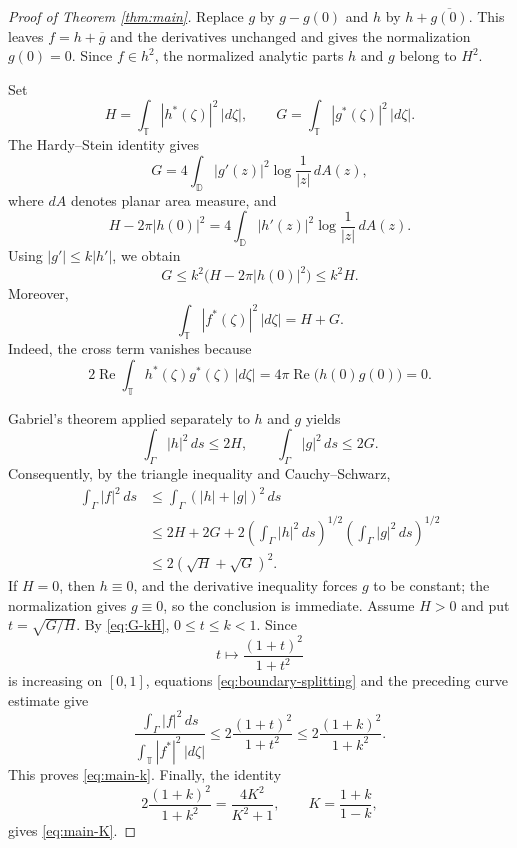 \documentclass[11pt]{article}
\theoremstyle{definition}
\theoremstyle{remark}
\newcommand{\D}{\mathbb D}
\newcommand{\T}{\mathbb T}
\newcommand{\ds}{\,ds}
\begin{document}
\begin{proof}[Proof of Theorem \ref{thm:main}]
Replace $g$ by $g-g(0)$ and $h$ by $h+\overline{g(0)}$. This leaves $f=h+\overline g$ and the derivatives unchanged and gives the normalization $g(0)=0$. Since $f\in h^2$, the normalized analytic parts $h$ and $g$ belong to $H^2$.

Set
\[
   H=\int_\T |h^*(\zeta)|^2\,|d\zeta|,
   \qquad
   G=\int_\T |g^*(\zeta)|^2\,|d\zeta|.
\]
The Hardy--Stein identity gives
\[
   G=4\int_\D |g'(z)|^2\log\frac1{|z|}\,dA(z),
\]
where $dA$ denotes planar area measure, and
\[
   H-2\pi |h(0)|^2
   =4\int_\D |h'(z)|^2\log\frac1{|z|}\,dA(z).
\]
Using $|g'|\le k|h'|$, we obtain
\begin{equation}\label{eq:G-kH}
   G\le k^2\bigl(H-2\pi |h(0)|^2\bigr)\le k^2H.
\end{equation}
Moreover,
\begin{equation}\label{eq:boundary-splitting}
   \int_\T |f^*(\zeta)|^2\,|d\zeta|=H+G.
\end{equation}
Indeed, the cross term vanishes because
\[
   2\operatorname{Re}\int_\T h^*(\zeta)g^*(\zeta)\,|d\zeta|
   =4\pi\operatorname{Re}\bigl(h(0)g(0)\bigr)=0.
\]

Gabriel's theorem applied separately to $h$ and $g$ yields
\[
   \int_\Gamma |h|^2\ds\le 2H,
   \qquad
   \int_\Gamma |g|^2\ds\le 2G.
\]
Consequently, by the triangle inequality and Cauchy--Schwarz,
\begin{align*}
   \int_\Gamma |f|^2\ds
   &\le \int_\Gamma (|h|+|g|)^2\ds \\
   &\le 2H+2G
      +2\left(\int_\Gamma |h|^2\ds\right)^{1/2}
        \left(\int_\Gamma |g|^2\ds\right)^{1/2} \\
   &\le 2(\sqrt H+\sqrt G)^2.
\end{align*}
If $H=0$, then $h\equiv0$, and the derivative inequality forces $g$ to be constant; the normalization gives $g\equiv0$, so the conclusion is immediate. Assume $H>0$ and put $t=\sqrt{G/H}$. By \eqref{eq:G-kH}, $0\le t\le k<1$. Since
\[
   t\longmapsto \frac{(1+t)^2}{1+t^2}
\]
is increasing on $[0,1]$, equations \eqref{eq:boundary-splitting} and the preceding curve estimate give
\[
   \frac{\displaystyle\int_\Gamma |f|^2\ds}
        {\displaystyle\int_\T |f^*|^2\,|d\zeta|}
   \le 2\frac{(1+t)^2}{1+t^2}
   \le 2\frac{(1+k)^2}{1+k^2}.
\]
This proves \eqref{eq:main-k}. Finally, the identity
\[
   2\frac{(1+k)^2}{1+k^2}
   =\frac{4K^2}{K^2+1},
   \qquad K=\frac{1+k}{1-k},
\]
gives \eqref{eq:main-K}.
\end{proof}
\end{document}

